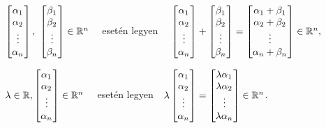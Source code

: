\documentclass[a4paper,11.5pt]{article}
\begin{document}
	{\centering 
		$\begin{bmatrix}
		\alpha_{1}\s \\
		\alpha_{2}\s \\
		\vdots\\
		\alpha_{n}\s \\
		\end{bmatrix},~
		\begin{bmatrix}
		\beta_{1}\s \\
		\beta_{2}\s \\
		\vdots\\
		\beta_{n}\s \\
		\end{bmatrix} \in\Rn\quad$ {esetén legyen}
		$\quad
		\begin{bmatrix}
		\alpha_{1}\s \\
		\alpha_{2}\s \\
		\vdots\\
		\alpha_{n}\s \\
		\end{bmatrix} +
		\begin{bmatrix}
		\beta_{1}\s \\
		\beta_{2}\s \\
		\vdots\\
		\beta_{n}\s \\
		\end{bmatrix} =
		\begin{bmatrix}
		\alpha_{1}+\beta_{1}\s \\
		\alpha_{2}+\beta_{2}\s \\
		\vdots\\
		\alpha_{n}+\beta_{n}\s \\
		\end{bmatrix} \in \Rn, $
		
		$\lambda \in  \R,
		\begin{bmatrix}
		\alpha_{1}\s \\
		\alpha_{2}\s \\
		\vdots\\
		\alpha_{n}\s \\
		\end{bmatrix} \in  \Rn\quad$ {esetén legyen}$\quad
		\lambda
		\begin{bmatrix}
		\alpha_{1}\s \\
		\alpha_{2}\s \\
		\vdots\\
		\alpha_{n}\s \\
		\end{bmatrix} =
		\begin{bmatrix}
		\lambda\alpha_{1}\s \\
		\lambda\alpha_{2}\s \\
		\vdots\\
		\lambda\alpha_{n}\s \\
		\end{bmatrix} \in  \Rn$. 
		\par}
	
\end{document}
